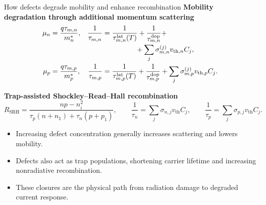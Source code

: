 \documentclass[aspectratio=169,10pt]{beamer}
\begin{document}
\begin{frame}{How defects degrade mobility and enhance recombination}
\footnotesize
\textbf{Mobility degradation through additional momentum scattering}
\vspace{-0.25em}
\begin{align*}
\mu_n&=\frac{q\tau_{m,n}}{m_n^*},
&
\frac{1}{\tau_{m,n}}&=\frac{1}{\tau_{m,n}^{\mathrm{lat}}(T)}+\frac{1}{\tau_{m,n}^{\mathrm{dop}}}+\\[-0.2em]
&&&\hspace{4.7em}+\sum_j \sigma_{m,n}^{(j)}v_{\mathrm{th},n}C_j,\\[-0.05em]
\mu_p&=\frac{q\tau_{m,p}}{m_p^*},
&
\frac{1}{\tau_{m,p}}&=\frac{1}{\tau_{m,p}^{\mathrm{lat}}(T)}+\frac{1}{\tau_{m,p}^{\mathrm{dop}}}+
\sum_j \sigma_{m,p}^{(j)}v_{\mathrm{th},p}C_j.
\end{align*}

\vspace{-0.3em}
\textbf{Trap-assisted Shockley--Read--Hall recombination}
\vspace{-0.25em}
\begin{equation*}
R_{\mathrm{SRH}}
=
\frac{np-n_i^2}
{\tau_p(n+n_1)+\tau_n(p+p_1)},
\qquad
\frac{1}{\tau_n}=\sum_j\sigma_{n,j}v_{\mathrm{th}}C_j,
\qquad
\frac{1}{\tau_p}=\sum_j\sigma_{p,j}v_{\mathrm{th}}C_j.
\end{equation*}

\vspace{-0.25em}
\begin{itemize}
    \item Increasing defect concentration generally increases scattering and lowers mobility.
    \item Defects also act as trap populations, shortening carrier lifetime and increasing nonradiative recombination.
    \item These closures are the physical path from radiation damage to degraded current response.
\end{itemize}
\end{frame}
\end{document}
